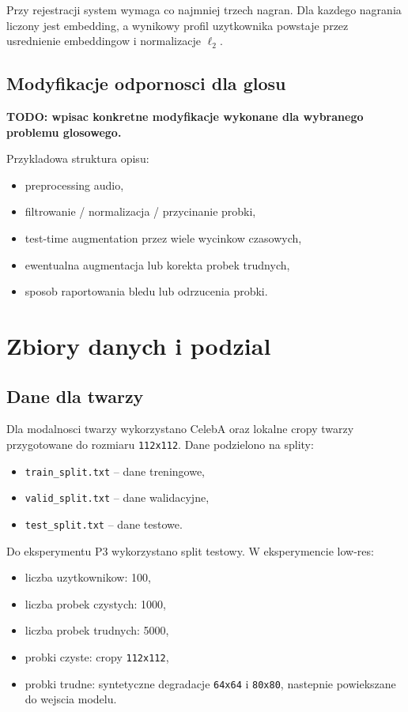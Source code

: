 \documentclass[12pt]{article}
\begin{document}
Przy rejestracji system wymaga co najmniej trzech nagran. Dla kazdego nagrania liczony jest embedding, a wynikowy profil uzytkownika powstaje przez usrednienie embeddingow i normalizacje $\ell_2$.

\subsection{Modyfikacje odpornosci dla glosu}

\textbf{TODO: wpisac konkretne modyfikacje wykonane dla wybranego problemu glosowego.}

Przykladowa struktura opisu:

\begin{itemize}
    \item preprocessing audio,
    \item filtrowanie / normalizacja / przycinanie probki,
    \item test-time augmentation przez wiele wycinkow czasowych,
    \item ewentualna augmentacja lub korekta probek trudnych,
    \item sposob raportowania bledu lub odrzucenia probki.
\end{itemize}

\section{Zbiory danych i podzial}

\subsection{Dane dla twarzy}

Dla modalnosci twarzy wykorzystano CelebA oraz lokalne cropy twarzy przygotowane do rozmiaru \texttt{112x112}. Dane podzielono na splity:

\begin{itemize}
    \item \texttt{train\_split.txt} -- dane treningowe,
    \item \texttt{valid\_split.txt} -- dane walidacyjne,
    \item \texttt{test\_split.txt} -- dane testowe.
\end{itemize}

Do eksperymentu P3 wykorzystano split testowy. W eksperymencie low-res:

\begin{itemize}
    \item liczba uzytkownikow: 100,
    \item liczba probek czystych: 1000,
    \item liczba probek trudnych: 5000,
    \item probki czyste: cropy \texttt{112x112},
    \item probki trudne: syntetyczne degradacje \texttt{64x64} i \texttt{80x80}, nastepnie powiekszane do wejscia modelu.
\end{itemize}
\end{document}
